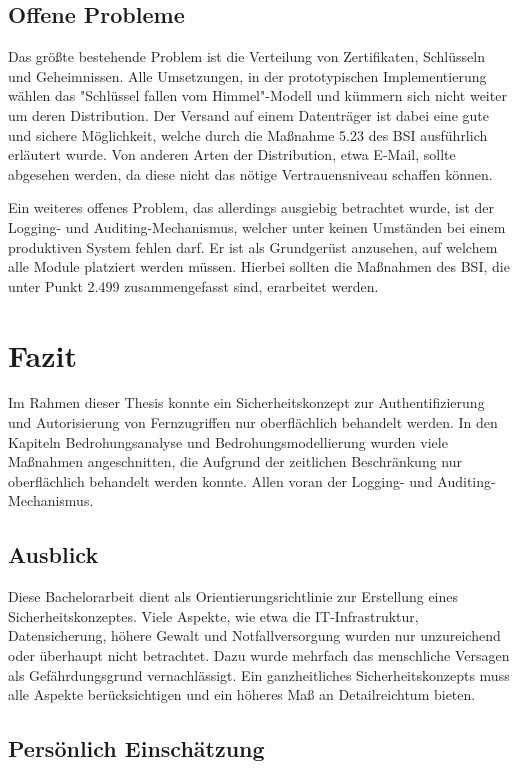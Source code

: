 \documentclass[11pt,a4paper]{report}
\begin{document}
\section{Offene Probleme}

Das größte bestehende Problem ist die Verteilung von Zertifikaten, Schlüsseln und Geheimnissen. Alle Umsetzungen, in der prototypischen Implementierung wählen das "Schlüssel fallen vom Himmel"-Modell und kümmern sich nicht weiter um deren Distribution. Der Versand auf einem Datenträger ist dabei eine gute und sichere Möglichkeit, welche durch die Maßnahme 5.23 des BSI ausführlich erläutert wurde. Von anderen Arten der Distribution, etwa E-Mail, sollte abgesehen werden, da diese nicht das nötige Vertrauensniveau schaffen können.

Ein weiteres offenes Problem, das allerdings ausgiebig betrachtet wurde, ist der Logging- und Auditing-Mechanismus, welcher unter keinen Umständen bei einem produktiven System fehlen darf. Er ist als Grundgerüst anzusehen, auf welchem alle Module platziert werden müssen. Hierbei sollten die Maßnahmen des BSI, die unter Punkt 2.499 \cite{bsi_m2499} zusammengefasst sind, erarbeitet werden.

\chapter{Fazit}

Im Rahmen dieser Thesis konnte ein Sicherheitskonzept zur Authentifizierung und Autorisierung von Fernzugriffen nur oberflächlich behandelt werden. In den Kapiteln Bedrohungsanalyse und Bedrohungsmodellierung wurden viele Maßnahmen angeschnitten, die Aufgrund der zeitlichen Beschränkung nur oberflächlich behandelt werden konnte. Allen voran der Logging- und Auditing-Mechanismus.

\section{Ausblick}

Diese Bachelorarbeit dient als Orientierungsrichtlinie zur Erstellung eines Sicherheitskonzeptes. Viele Aspekte, wie etwa die IT-Infrastruktur, Datensicherung, höhere Gewalt und Notfallversorgung wurden nur unzureichend oder überhaupt nicht betrachtet. Dazu wurde mehrfach das menschliche Versagen als Gefährdungsgrund vernachlässigt. Ein ganzheitliches Sicherheitskonzepts muss alle Aspekte berücksichtigen und ein höheres Maß an Detailreichtum bieten.

\section{Persönlich Einschätzung}
\end{document}
